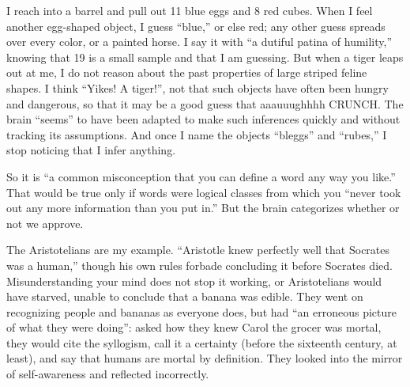 
I reach into a barrel and pull out 11 blue eggs and 8 red cubes. When I feel another egg-shaped object, I guess ``blue,'' or else red; any other guess spreads over every color, or a painted horse. I say it with ``a dutiful patina of humility,'' knowing that 19 is a small sample and that I am guessing. But when a tiger leaps out at me, I do not reason about the past properties of large striped feline shapes. I think ``Yikes! A tiger!'', not that such objects have often been hungry and dangerous, so that it may be a good guess that aaauuughhhh CRUNCH. The brain ``seems'' to have been adapted to make such inferences quickly and without tracking its assumptions. And once I name the objects ``bleggs'' and ``rubes,'' I stop noticing that I infer anything.

So it is ``a common misconception that you can define a word any way you like.'' That would be true only if words were logical classes from which you ``never took out any more information than you put in.'' But the brain categorizes whether or not we approve. 

The Aristotelians are my example. ``Aristotle knew perfectly well that Socrates was a human,'' though his own rules forbade concluding it before Socrates died.  Misunderstanding your mind does not stop it working, or Aristotelians would have starved, unable to conclude that a banana was edible. They went on recognizing people and bananas as everyone does, but had ``an erroneous picture of what they were doing'': asked how they knew Carol the grocer was mortal, they would cite the syllogism, call it a certainty (before the sixteenth century, at least), and say that humans are mortal by definition. They looked into the mirror of self-awareness and reflected incorrectly. 

